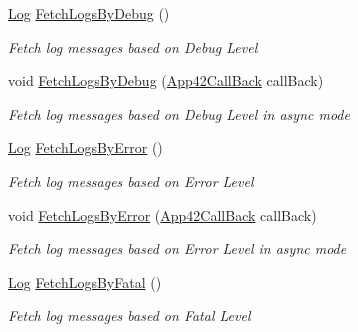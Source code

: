 \begin{DoxyCompactItemize}
\hyperlink{classcom_1_1shephertz_1_1app42_1_1paas_1_1sdk_1_1csharp_1_1log_1_1_log}{Log} \hyperlink{classcom_1_1shephertz_1_1app42_1_1paas_1_1sdk_1_1csharp_1_1log_1_1_log_service_a3d8de2652fd08e3c5dcd509718ba8e3c}{Fetch\+Logs\+By\+Debug} ()
\begin{DoxyCompactList}\small\item\em Fetch log messages based on Debug Level \end{DoxyCompactList}\item 
void \hyperlink{classcom_1_1shephertz_1_1app42_1_1paas_1_1sdk_1_1csharp_1_1log_1_1_log_service_a744c464e29b66b8b34b5732c9ea6b845}{Fetch\+Logs\+By\+Debug} (\hyperlink{interfacecom_1_1shephertz_1_1app42_1_1paas_1_1sdk_1_1csharp_1_1_app42_call_back}{App42\+Call\+Back} call\+Back)
\begin{DoxyCompactList}\small\item\em Fetch log messages based on Debug Level in async mode \end{DoxyCompactList}\item 
\hyperlink{classcom_1_1shephertz_1_1app42_1_1paas_1_1sdk_1_1csharp_1_1log_1_1_log}{Log} \hyperlink{classcom_1_1shephertz_1_1app42_1_1paas_1_1sdk_1_1csharp_1_1log_1_1_log_service_a5f86bf7974a6bc9f2a4da3795314113e}{Fetch\+Logs\+By\+Error} ()
\begin{DoxyCompactList}\small\item\em Fetch log messages based on Error Level \end{DoxyCompactList}\item 
void \hyperlink{classcom_1_1shephertz_1_1app42_1_1paas_1_1sdk_1_1csharp_1_1log_1_1_log_service_aa4cca18e66bd70f2d1ca45f864f7873c}{Fetch\+Logs\+By\+Error} (\hyperlink{interfacecom_1_1shephertz_1_1app42_1_1paas_1_1sdk_1_1csharp_1_1_app42_call_back}{App42\+Call\+Back} call\+Back)
\begin{DoxyCompactList}\small\item\em Fetch log messages based on Error Level in async mode \end{DoxyCompactList}\item 
\hyperlink{classcom_1_1shephertz_1_1app42_1_1paas_1_1sdk_1_1csharp_1_1log_1_1_log}{Log} \hyperlink{classcom_1_1shephertz_1_1app42_1_1paas_1_1sdk_1_1csharp_1_1log_1_1_log_service_a412c91a12a6ccec1b70d9fa6d6b7fce0}{Fetch\+Logs\+By\+Fatal} ()
\begin{DoxyCompactList}\small\item\em Fetch log messages based on Fatal Level \end{DoxyCompactList}\item 

\end{DoxyCompactItemize}
